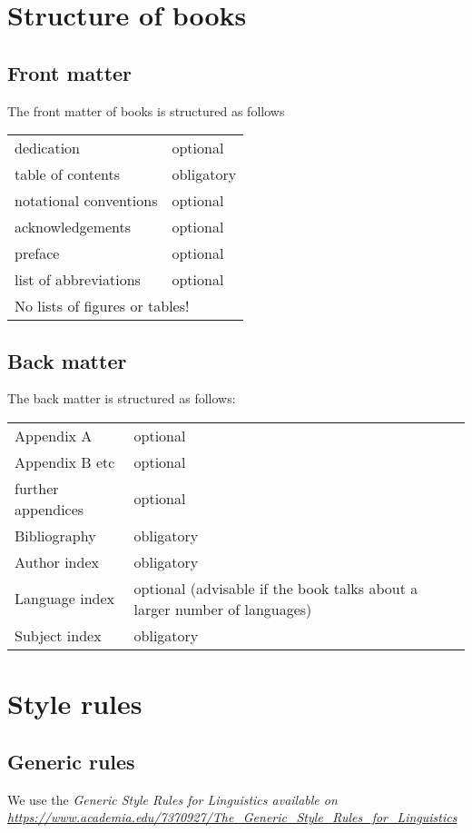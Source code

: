 \chapter{Structure of books}

\section{Front matter}

The front matter of \lsp books is structured as follows
\begin{table}[h]
\begin{tabular}{p{4cm}p{6cm}}
 dedication & optional\\
table of contents & obligatory\\
notational conventions & optional\\
acknowledgements & optional\\
preface & optional\\
list of abbreviations & optional\\
\multicolumn{2}{l}{No lists of figures or tables!}\\
\end{tabular}
\end{table}
\section{Back matter}
The back matter is structured as follows:
\begin{table}[h]
\begin{tabular}{p{4cm}p{6cm}}
 Appendix A & optional \\
 Appendix B etc & optional \\
 further appendices & optional \\
 Bibliography & obligatory \\
 Author index & obligatory \\
 Language index  & optional (advisable if the book talks about a larger number of languages)\\
 Subject index & obligatory \\
\end{tabular}
 \end{table}


\chapter{Style rules}
\section{Generic rules}
We use the \em Generic Style Rules for Linguistics \em available on \url{https://www.academia.edu/7370927/The_Generic_Style_Rules_for_Linguistics}

